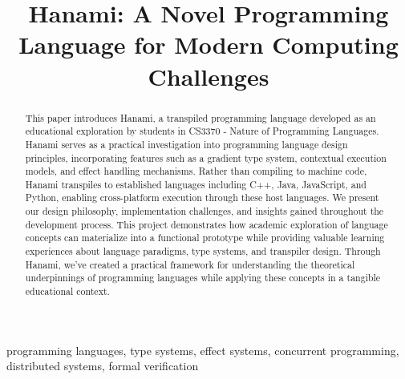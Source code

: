 \documentclass[conference]{IEEEtran}
\begin{document}
\title{Hanami: A Novel Programming Language for Modern Computing Challenges}

\author{
    \and
    \and
    \and
}

\maketitle

\begin{abstract}
    This paper introduces Hanami, a transpiled programming language developed as an educational exploration by students in CS3370 - Nature of Programming Languages. Hanami serves as a practical investigation into programming language design principles, incorporating features such as a gradient type system, contextual execution models, and effect handling mechanisms. Rather than compiling to machine code, Hanami transpiles to established languages including C++, Java, JavaScript, and Python, enabling cross-platform execution through these host languages. We present our design philosophy, implementation challenges, and insights gained throughout the development process. This project demonstrates how academic exploration of language concepts can materialize into a functional prototype while providing valuable learning experiences about language paradigms, type systems, and transpiler design. Through Hanami, we've created a practical framework for understanding the theoretical underpinnings of programming languages while applying these concepts in a tangible educational context.
\end{abstract}

\begin{IEEEkeywords}
    programming languages, type systems, effect systems, concurrent programming, distributed systems, formal verification
\end{IEEEkeywords}
\end{document}
